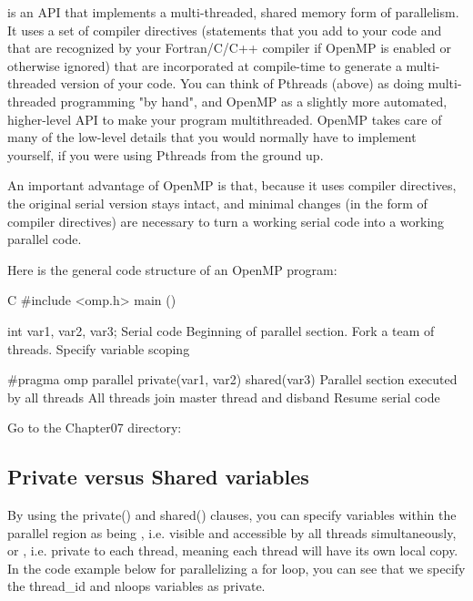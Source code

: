  is an API that implements a multi-threaded, shared
memory form of parallelism. It uses a set of compiler directives (statements
that you add to your code and that are recognized by your Fortran/C/C++
compiler if OpenMP is enabled or otherwise ignored) that are incorporated at
compile-time to generate a multi-threaded version of your code. You can think
of Pthreads (above) as doing multi-threaded programming "by hand", and OpenMP
as a slightly more automated, higher-level API to make your program
multithreaded. OpenMP takes care of many of the low-level details that you
would normally have to implement yourself, if you were using Pthreads from the
ground up.

An important advantage of OpenMP is that, because it uses compiler directives,
the original serial version stays intact, and minimal changes (in the form of
compiler directives) are necessary to turn a working serial code into a working
parallel code.

Here is the general code structure of an OpenMP program:

\begin{code}{C}
#include <omp.h>
main ()  {
int var1, var2, var3;
Serial code
Beginning of parallel section. Fork a team of threads.
Specify variable scoping

#pragma omp parallel private(var1, var2) shared(var3)
  {
  Parallel section executed by all threads
  All threads join master thread and disband
  }
Resume serial code
}
\end{code}

Go to the Chapter07 directory:

\begin{prompt}
\end{prompt}

\subsection{Private versus Shared variables}

By using the private() and shared() clauses, you can specify variables within
the parallel region as being , i.e. visible and accessible by
all threads simultaneously, or , i.e. private to each thread,
meaning each thread will have its own local copy. In the code example below for
parallelizing a for loop, you can see that we specify the thread\_id and nloops
variables as private.

